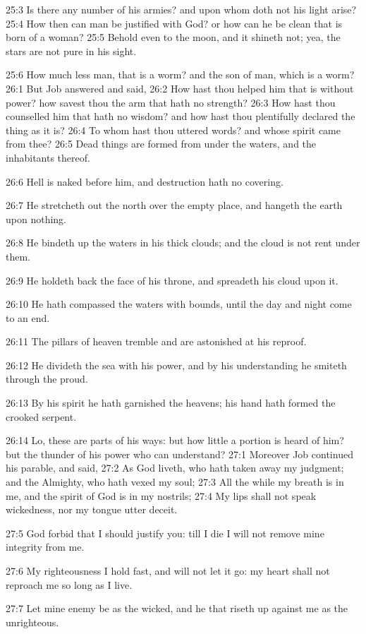 25:3 Is there any number of his armies? and upon whom doth not his
light arise?  25:4 How then can man be justified with God? or how can
he be clean that is born of a woman?  25:5 Behold even to the moon,
and it shineth not; yea, the stars are not pure in his sight.

25:6 How much less man, that is a worm? and the son of man, which is a
worm?  26:1 But Job answered and said, 26:2 How hast thou helped him
that is without power? how savest thou the arm that hath no strength?
26:3 How hast thou counselled him that hath no wisdom? and how hast
thou plentifully declared the thing as it is?  26:4 To whom hast thou
uttered words? and whose spirit came from thee?  26:5 Dead things are
formed from under the waters, and the inhabitants thereof.

26:6 Hell is naked before him, and destruction hath no covering.

26:7 He stretcheth out the north over the empty place, and hangeth the
earth upon nothing.

26:8 He bindeth up the waters in his thick clouds; and the cloud is
not rent under them.

26:9 He holdeth back the face of his throne, and spreadeth his cloud
upon it.

26:10 He hath compassed the waters with bounds, until the day and
night come to an end.

26:11 The pillars of heaven tremble and are astonished at his reproof.

26:12 He divideth the sea with his power, and by his understanding he
smiteth through the proud.

26:13 By his spirit he hath garnished the heavens; his hand hath
formed the crooked serpent.

26:14 Lo, these are parts of his ways: but how little a portion is
heard of him? but the thunder of his power who can understand?  27:1
Moreover Job continued his parable, and said, 27:2 As God liveth, who
hath taken away my judgment; and the Almighty, who hath vexed my soul;
27:3 All the while my breath is in me, and the spirit of God is in my
nostrils; 27:4 My lips shall not speak wickedness, nor my tongue utter
deceit.

27:5 God forbid that I should justify you: till I die I will not
remove mine integrity from me.

27:6 My righteousness I hold fast, and will not let it go: my heart
shall not reproach me so long as I live.

27:7 Let mine enemy be as the wicked, and he that riseth up against me
as the unrighteous.

